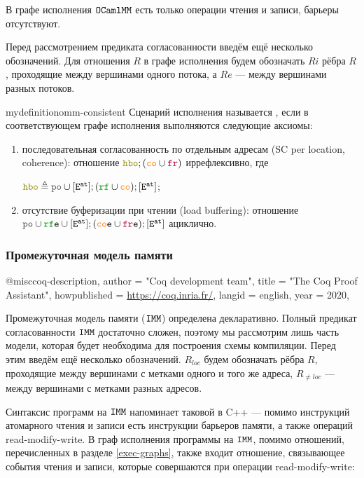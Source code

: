 В графе исполнения $\mathtt{OCaml}\allowbreak \mathtt{MM}$ есть только операции чтения и записи, барьеры отсутствуют.

Перед рассмотрением предиката согласованности введём ещё несколько обозначений. Для отношения $R$ в графе исполнения будем обозначать $Ri$ рёбра $R$, проходящие между вершинами одного потока, а $Re$ --- между вершинами разных потоков. 

\begin{restatable}{mydefinition}{omm-consistent}
  Сценарий исполнения называется , если в соответствующем графе исполнения выполняются следующие аксиомы:

  \begin{enumerate}
  \item последовательная согласованность по отдельным адресам (SC per location, coherence): отношение $\lHBO ; (\lCO \cup \lFR)$ иррефлексивно, где

    $\lHBO \defeq \lPO \cup [\lE^{\at}] ; (\lRF \cup \lCO) ; [\lE^{\at}]$;
    
  \item отсутствие буферизации при чтении (load buffering): отношение $\lPO \cup \lRFE \cup [\lE^{\at}] ; (\lCOE \cup \lFRE) ; [\lE^{\at}]$ ациклично.
  \end{enumerate}
\end{restatable}

\subsubsection{Промежуточная модель памяти}

@misc{coq-description,
    author    = "Coq development team",
    title     = "The Coq Proof Assistant",
    howpublished = {\url{https://coq.inria.fr/}},
    langid = {english},
    year = {2020},
}

Промежуточная модель памяти ($\mathtt{IMM}$) определена декларативно. Полный предикат согласованности $\mathtt{IMM}$ достаточно сложен, поэтому мы рассмотрим лишь часть модели, которая будет необходима для построения схемы компиляции. Перед этим введём ещё несколько обозначений. $R_{loc}$ будем обозначать рёбра $R$, проходящие между вершинами с метками одного и того же адреса, $R_{\neq loc}$ --- между вершинами с метками разных адресов.

Синтаксис программ на $\mathtt{IMM}$ напоминает таковой в C++ --- помимо инструкций атомарного чтения и записи есть инструкции барьеров памяти, а также операций read-modify-write. В граф исполнения программы на $\mathtt{IMM}$, помимо отношений, перечисленных в разделе \ref{exec-graphs}, также входит отношение, связывающее события чтения и записи, которые совершаются при операции read-modify-write:

